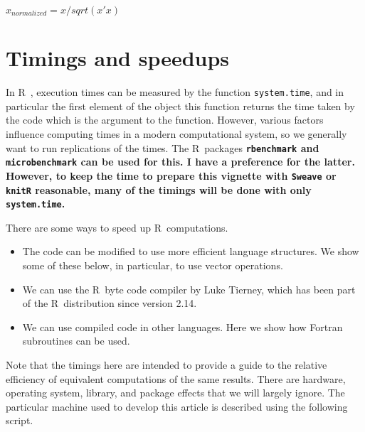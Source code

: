 \documentclass[10pt]{article}\usepackage[]{graphicx}\usepackage[]{color}
\newcommand{\R}{{\sf R\ }}
\newcommand{\code}[1]{{\tt #1}}
\newcommand{\pkg}[1]{\bf{\tt #1}\rm }
\begin{document}
$ x_{normalized} = x/sqrt(x' x) $

\section{Timings and speedups}

In \R, execution times can be measured by the function \code{system.time},
and in particular the first element of the object this function returns the time
taken by the code which is the argument to the function. 
However, various factors influence computing times in a modern computational
system, so we generally want to run replications of the times. The \R packages
\pkg{rbenchmark} and \pkg{microbenchmark} can be used for this. I have a 
preference for the latter. However, to keep the time to prepare this vignette
with \pkg{Sweave} or \pkg{knitR} reasonable, many of the timings will be
done with only \code{system.time}.

There are some ways to speed up \R computations. 

\begin{itemize}
\item{The code can be modified to use more efficient language structures. We
show some of these below, in particular, to use vector operations.}
\item{We can use the \R byte code compiler by Luke Tierney, which has been 
part of the \R distribution since version 2.14.}
\item{We can use compiled code in other languages. Here we show how Fortran
subroutines can be used.}
\end{itemize}

Note that the timings here are intended to provide a guide to the relative 
efficiency of equivalent computations of the same results. There are hardware,
operating system, library, and package effects that we will largely ignore.
The particular machine used to develop this article is described using 
the following script.
\end{document}
